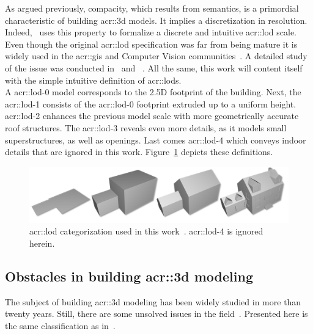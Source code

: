             As argued previously, compacity, which results from semantics, is a primordial characteristic of building \gls{acr::3d} models.
            It implies a discretization in resolution.
            Indeed,~\textcite{groger2012citygml} uses this property to formalize a discrete and intuitive \gls{acr::lod} scale.
            Even though the original \gls{acr::lod} specification was far from being mature it is widely used in the \gls{acr::gis} and Computer Vision communities~\parencite{biljecki2014formalisation, rau2006lod}.
            A detailed study of the issue was conducted in~\textcite{biljecki2014formalisation} and ~\textcite{biljecki2016improved}.
            All the same, this work will content itself with the simple intuitive definition of \glspl{acr::lod}.\\
            A \gls*{acr::lod}-0 model corresponds to the 2.5D footprint of the building.
            Next, the \gls*{acr::lod}-1 consists of the \gls*{acr::lod}-0 footprint extruded up to a uniform height.
            \gls*{acr::lod}-2 enhances the previous model scale with more geometrically accurate roof structures.
            The \gls*{acr::lod}-3 reveals even more details, as it models small superstructures, as well as openings.
            Last comes \gls*{acr::lod}-4 which conveys indoor details that are ignored in this work.
            Figure~\ref{fig::lods} depicts these definitions.\\

            \begin{figure}[htpb]
                \centering
                \includegraphics[width=.7\textwidth]{images/lods}            
                \caption{
                    \label{fig::lods} \gls{acr::lod} categorization used in this work~\parencite{biljecki2016improved}.
                    \gls{acr::lod}-4 is ignored herein.
                }
            \end{figure}
    \subsection{Obstacles in building \gls*{acr::3d} modeling}
        \label{subsec::introduction::urban_3d_reconstruction::challenges}
        The subject of building \gls{acr::3d} modeling has been widely studied in more than twenty years.
        Still, there are some unsolved issues in the field~\parencite{musialski2013survey, lafarge2015some}.
        Presented here is the same classification as in~\textcite{lafarge2015some}.

